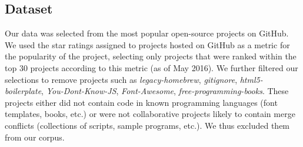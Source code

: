\documentclass{sig-alternate-05-2015}
\begin{document}
\subsection{Dataset}\label{dataset}
Our data was selected from the most popular open-source projects on GitHub. We used the star ratings assigned to projects hosted on GitHub as a metric for the popularity of the project, selecting only projects that were ranked within the top 30 projects according to this metric (as of May 2016). We further filtered our selections to remove projects such as \textit{legacy-homebrew}, \textit{gitignore}, \textit{html5-boilerplate}, \textit{You-Dont-Know-JS}, \textit{Font-Awesome}, \textit{free-programming-books}. These projects either did not contain code in known programming languages (font templates, books, etc.) or were not collaborative projects likely to contain merge conflicts (collections of scripts, sample programs, etc.). We thus excluded them from our corpus.
\end{document}
